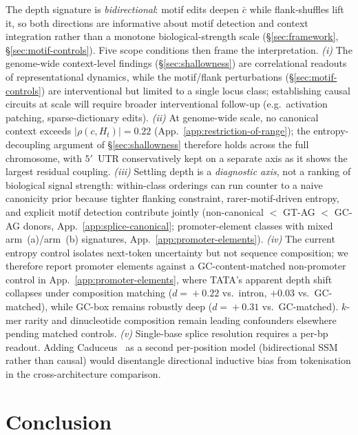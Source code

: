 \documentclass{article}
\theoremstyle{plain}
\theoremstyle{definition}
\theoremstyle{remark}
\begin{document}
The depth signature is \emph{bidirectional}: motif edits deepen $\bar c$ while flank-shuffles lift it, so both directions are informative about motif detection and context integration rather than a monotone biological-strength scale (\S\ref{sec:framework}, \S\ref{sec:motif-controls}). Five scope conditions then frame the interpretation. \emph{(i)} The genome-wide context-level findings (\S\ref{sec:shallowness}) are correlational readouts of representational dynamics, while the motif/flank perturbations (\S\ref{sec:motif-controls}) are interventional but limited to a single locus class; establishing causal circuits at scale will require broader interventional follow-up (e.g.\ activation patching, sparse-dictionary edits). \emph{(ii)} At genome-wide scale, no canonical context exceeds $|\rho(c, H_t)|\!=\!0.22$ (App.~\ref{app:restriction-of-range}); the entropy-decoupling argument of \S\ref{sec:shallowness} therefore holds across the full chromosome, with $5'$~UTR conservatively kept on a separate axis as it shows the largest residual coupling. \emph{(iii)} Settling depth is a \emph{diagnostic axis}, not a ranking of biological signal strength: within-class orderings can run counter to a naive canonicity prior because tighter flanking constraint, rarer-motif-driven entropy, and explicit motif detection contribute jointly (non-canonical $<$ GT-AG $<$ GC-AG donors, App.~\ref{app:splice-canonical}; promoter-element classes with mixed arm~(a)/arm~(b) signatures, App.~\ref{app:promoter-elements}). \emph{(iv)} The current entropy control isolates next-token uncertainty but not sequence composition; we therefore report promoter elements against a GC-content-matched non-promoter control in App.~\ref{app:promoter-elements}, where TATA's apparent depth shift collapses under composition matching ($d\!=\!+0.22$ vs.\ intron, $+0.03$ vs.\ GC-matched), while GC-box remains robustly deep ($d\!=\!+0.31$ vs.\ GC-matched). $k$-mer rarity and dinucleotide composition remain leading confounders elsewhere pending matched controls. \emph{(v)} Single-base splice resolution requires a per-bp readout. Adding Caduceus~\cite{schiff2024caduceus} as a second per-position model (bidirectional SSM rather than causal) would disentangle directional inductive bias from tokenisation in the cross-architecture comparison.

\section{Conclusion}
\label{sec:conclusion}
\end{document}
